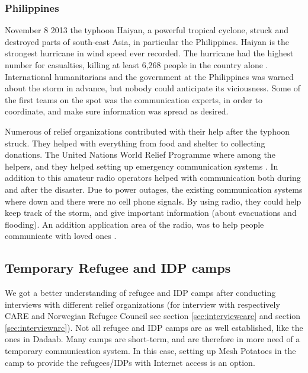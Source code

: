 \subsubsection{Philippines}
November 8 2013 the typhoon Haiyan, a powerful tropical cyclone, struck and destroyed parts of south-east Asia, in particular the Philippines. Haiyan is the strongest hurricane in wind speed ever recorded. The hurricane had the highest number for casualties, killing at least 6,268 people in the country alone \cite{wikiHaiyan}. International humanitarians and the government at the Philippines was warned about the storm in advance, but nobody could anticipate its viciousness. Some of the first teams on the spot was the communication experts, in order to coordinate, and make sure information was spread as desired.    \cite{disasterResponse} 

Numerous of relief organizations contributed with their help after the typhoon struck. They helped with everything from food and shelter to collecting donations. The United Nations World Relief Programme where among the helpers, and they helped setting up emergency communication systems \cite{philippines}. In addition to this amateur radio operators helped with communication both during and after the disaster. Due to power outages, the existing communication systems where down and there were no cell phone signals. By using radio, they could help keep track of the storm, and give important information (about evacuations and flooding). An addition application area of the radio, was to help people communicate with loved ones \cite{philippinesradio}. 


\subsection{Temporary Refugee and IDP camps}
We got a better understanding of refugee and IDP camps after conducting interviews with different relief organizations (for interview with respectively CARE and Norwegian Refugee Council see section \ref{sec:interviewcare} and section \ref{sec:interviewnrc}). 
Not all refugee and IDP camps are as well established, like the ones in Dadaab. Many camps are short-term, and are therefore in more need of a temporary communication system. In this case, setting up Mesh Potatoes in the camp to provide the refugees/IDPs with Internet access is an option. 

